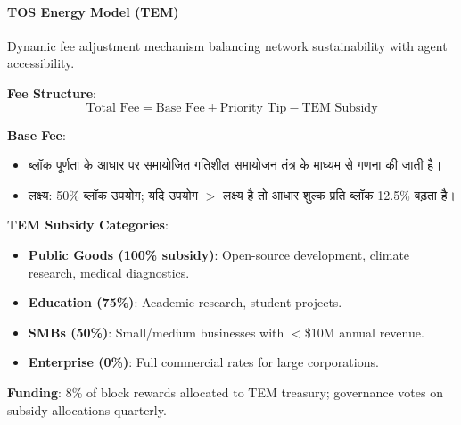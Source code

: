 \documentclass[11pt]{article}
\begin{document}
\begin{itemize}[noitemsep]
\begin{itemize}[noitemsep]
\paragraph{TOS Energy Model (TEM)}
Dynamic fee adjustment mechanism balancing network sustainability with agent accessibility.

\textbf{Fee Structure}:
\begin{equation}
\text{Total Fee} = \text{Base Fee} + \text{Priority Tip} - \text{TEM Subsidy}
\end{equation}

\textbf{Base Fee}:
\begin{itemize}[noitemsep]
  \item ब्लॉक पूर्णता के आधार पर समायोजित गतिशील समायोजन तंत्र के माध्यम से गणना की जाती है।
  \item लक्ष्य: 50\% ब्लॉक उपयोग; यदि उपयोग $>$ लक्ष्य है तो आधार शुल्क प्रति ब्लॉक 12.5\% बढ़ता है।
\end{itemize}

\textbf{TEM Subsidy Categories}:
\begin{itemize}[noitemsep]
  \item \textbf{Public Goods (100\% subsidy)}: Open-source development, climate research, medical diagnostics.
  \item \textbf{Education (75\%)}: Academic research, student projects.
  \item \textbf{SMBs (50\%)}: Small/medium businesses with $<$\$10M annual revenue.
  \item \textbf{Enterprise (0\%)}: Full commercial rates for large corporations.
\end{itemize}

\textbf{Funding}: 8\% of block rewards allocated to TEM treasury; governance votes on subsidy allocations quarterly.


\end{itemize}
\end{itemize}
\end{document}
